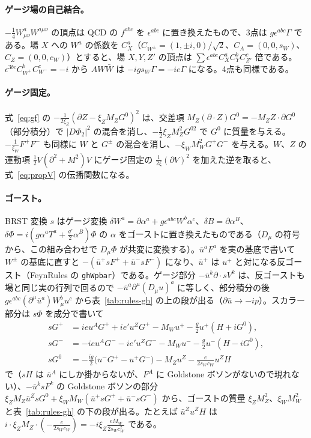 \documentclass[a4paper,10pt]{ltjsarticle}
\newcommand{\sw}{s_W}
\newcommand{\cw}{c_W}
\begin{document}
\paragraph{ゲージ場の自己結合。}$-\frac14W^a_{\mu\nu}W^{a\mu\nu}$ の頂点は QCD の $f^{abc}$ を $\epsilon^{abc}$ に置き換えたもので、3点は $g\epsilon^{abc}\Gamma$ である。場 $X$ への $W^a$ の係数を $C^a_X$（$C_{W^\pm}=(1,\pm i,0)/\sqrt2$、$C_A=(0,0,\sw)$、$C_Z=(0,0,\cw)$）とすると、場 $X,Y,Z'$ の頂点は $\sum\epsilon^{abc}C^a_XC^b_YC^c_{Z'}$ 倍である。$\epsilon^{3bc}C^b_{W^+}C^c_{W^-}=-i$ から $AW\bar W$ は $-ig\sw\Gamma=-ie\Gamma$ になる。4点も同様である。

\paragraph{ゲージ固定。}式~\eqref{eq:gf} の $-\frac1{2\xi_Z}(\partial Z-\xi_ZM_ZG^0)^2$ は、交差項 $M_Z(\partial\cdot Z)G^0=-M_ZZ\cdot\partial G^0$（部分積分）で $|D\Phi_2|^2$ の混合を消し、$-\frac12\xi_ZM_Z^2G^{02}$ で $G^0$ に質量を与える。$-\frac1{\xi_W}F^+F^-$ も同様に $W$ と $G^\pm$ の混合を消し、$-\xi_WM_W^2G^+G^-$ を与える。$W$、$Z$ の運動項 $\frac12V(\partial^2+M^2)V$ にゲージ固定の $\frac1{2\xi}(\partial V)^2$ を加えた逆を取ると、式~\eqref{eq:propV} の伝播関数になる。

\paragraph{ゴースト。}BRST 変換 $s$ はゲージ変換 $\delta W^a=\partial\alpha^a+g\epsilon^{abc}W^b\alpha^c$、$\delta B=\partial\alpha^B$、$\delta\Phi=i(g\alpha^aT^a+\frac{g'}2\alpha^B)\Phi$ の $\alpha$ をゴーストに置き換えたものである（$D_\mu$ の符号から、この組み合わせで $D_\mu\Phi$ が共変に変換する）。$\bar u^aF^a$ を実の基底で書いて $W^\pm$ の基底に直すと $-(\bar u^+sF^++\bar u^-sF^-)$ になり、$\bar u^+$ は $u^+$ と対になる反ゴースト（FeynRules の \texttt{ghWpbar}）である。ゲージ部分 $-\bar u^k\partial\cdot sV^k$ は、反ゴーストも場と同じ実の行列で回るので $-\bar u^a\partial^\mu(D_\mu u)^a$ に等しく、部分積分の後 $g\epsilon^{abc}(\partial^\mu\bar u^a)W^b_\mu u^c$ から表~\ref{tab:rules-gh} の上の段が出る（$\partial\bar u\to-ip$）。スカラー部分は $s\Phi$ を成分で書いて
\begin{equation*}
\begin{aligned}
sG^+&=ieu^AG^++ie'u^ZG^+-M_Wu^+-\frac g2u^+(H+iG^0),\\
sG^-&=-ieu^AG^--ie'u^ZG^--M_Wu^--\frac g2u^-(H-iG^0),\\
sG^0&=-\frac{ig}2\bigl(u^-G^+-u^+G^-\bigr)-M_Zu^Z-\frac e{2\sw\cw}u^ZH
\end{aligned}
\end{equation*}
で（$sH$ は $\bar u^A$ にしか掛からないが、$F^A$ に Goldstone ボソンがないので現れない）、$-\bar u^ksF^k$ の Goldstone ボソンの部分 $\xi_ZM_Z\bar u^ZsG^0+\xi_WM_W(\bar u^+sG^++\bar u^-sG^-)$ から、ゴーストの質量 $\xi_ZM_Z^2$、$\xi_WM_W^2$ と表~\ref{tab:rules-gh} の下の段が出る。たとえば $\bar u^Zu^ZH$ は $i\cdot\xi_ZM_Z\cdot(-\frac e{2\sw\cw})=-i\xi_Z\frac{eM_W}{2\sw\cw^2}$ である。
\end{document}
